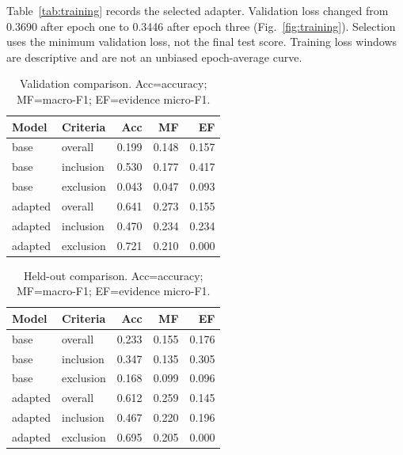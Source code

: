 Table~\ref{tab:training} records the selected adapter. Validation loss changed from 0.3690 after epoch one to 0.3446 after epoch three (Fig.~\ref{fig:training}). Selection uses the minimum validation loss, not the final test score. Training loss windows are descriptive and are not an unbiased epoch-average curve.

\begin{table}[t]\centering\small\caption{Validation comparison. Acc=accuracy; MF=macro-F1; EF=evidence micro-F1.}\label{tab:validation}\begin{tabular}{llrrr}\toprule Model & Criteria & Acc & MF & EF\\\midrule

base & overall & 0.199 & 0.148 & 0.157\\

base & inclusion & 0.530 & 0.177 & 0.417\\

base & exclusion & 0.043 & 0.047 & 0.093\\

adapted & overall & 0.641 & 0.273 & 0.155\\

adapted & inclusion & 0.470 & 0.234 & 0.234\\

adapted & exclusion & 0.721 & 0.210 & 0.000\\

\bottomrule\end{tabular}\end{table}

\begin{table}[t]\centering\small\caption{Held-out comparison. Acc=accuracy; MF=macro-F1; EF=evidence micro-F1.}\label{tab:test}\begin{tabular}{llrrr}\toprule Model & Criteria & Acc & MF & EF\\\midrule

base & overall & 0.233 & 0.155 & 0.176\\

base & inclusion & 0.347 & 0.135 & 0.305\\

base & exclusion & 0.168 & 0.099 & 0.096\\

adapted & overall & 0.612 & 0.259 & 0.145\\

adapted & inclusion & 0.467 & 0.220 & 0.196\\

adapted & exclusion & 0.695 & 0.205 & 0.000\\

\bottomrule\end{tabular}\end{table}

